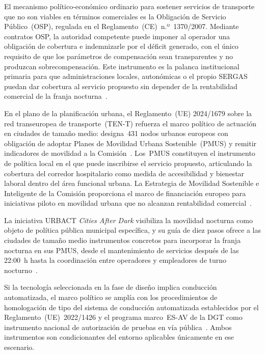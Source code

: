 El mecanismo político-económico ordinario para sostener servicios 
de transporte que no son viables en términos comerciales es la 
Obligación de Servicio Público~(OSP), regulada en el 
Reglamento~(CE)~n.º~1370/2007. Mediante contratos OSP, la 
autoridad competente puede imponer al operador una obligación 
de cobertura e indemnizarle por el déficit generado, con el 
único requisito de que los parámetros de compensación sean 
transparentes y no produzcan sobrecompensación. Este 
instrumento es la palanca institucional primaria para que 
administraciones locales, autonómicas o el propio SERGAS puedan 
dar cobertura al servicio propuesto sin depender de la 
rentabilidad comercial de la 
franja nocturna~\parencite{Reglamento_CE_1370_2007}.

En el plano de la planificación urbana, el Reglamento~(UE) 
2024/1679 sobre la red transeuropea de transporte~(TEN-T) 
refuerza el marco político de actuación en ciudades de tamaño 
medio: designa~431 nodos urbanos europeos con obligación de 
adoptar Planes de Movilidad Urbana Sostenible~(PMUS) y remitir 
indicadores de movilidad a la Comisión~\parencite{TENT20242024}. 
Los~PMUS constituyen el instrumento de política local en el que 
puede inscribirse el servicio propuesto, articulando la cobertura 
del corredor hospitalario como medida de accesibilidad y 
bienestar laboral dentro del área funcional urbana. 
La Estrategia de Movilidad Sostenible e Inteligente de la 
Comisión proporciona el marco de financiación europeo para 
iniciativas piloto en movilidad urbana que no alcanzan 
rentabilidad comercial~\parencite{CE_Movilidad2020}.

La iniciativa URBACT \textit{Cities After Dark} visibiliza la 
movilidad nocturna como objeto de política pública municipal 
específica, y su guía de diez pasos ofrece a las ciudades de 
tamaño medio instrumentos concretos para incorporar la franja 
nocturna en sus PMUS, desde el mantenimiento de servicios 
después de las 22:00~h hasta la coordinación entre operadores 
y empleadores de turno 
nocturno~\parencite{URBACTNight2024, dAntonio2024}.

Si la tecnología seleccionada en la fase de diseño implica 
conducción automatizada, el marco político se amplía con los 
procedimientos de homologación de tipo del sistema de conducción 
automatizada establecidos por el Reglamento~(UE)~2022/1426 y 
el programa marco~ES-AV de la DGT como instrumento nacional de 
autorización de pruebas en vía 
pública~\parencite{RegUE20221426, DGTESAV2026}. Ambos 
instrumentos son condicionantes del entorno aplicables 
únicamente en ese escenario.



